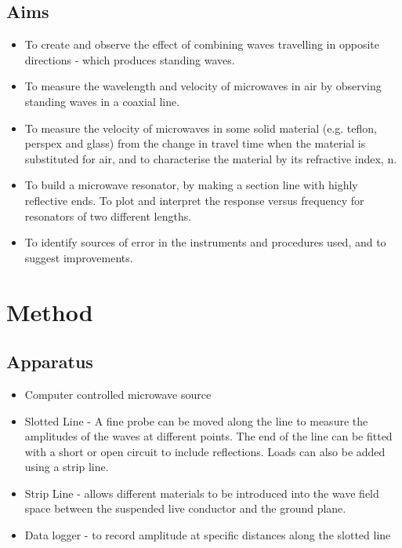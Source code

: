 \documentclass[12pt]{article}
\begin{document}
\subsection{Aims}
\begin{itemize}
    \item To create and observe the effect of combining waves travelling in opposite directions - 
    which produces standing waves.
    \item To measure the wavelength and velocity of microwaves in air by observing standing waves
    in a coaxial line.
    \item To measure the velocity of microwaves in some solid material (e.g. teflon, perspex and
    glass) from the change in travel time when the material is substituted for air, and to
    characterise the material by its refractive index, n.
    \item To build a microwave resonator, by making a section line with highly reflective ends. To
    plot and interpret the response versus frequency for resonators of two different lengths.
    \item To identify sources of error in the instruments and procedures used, and to suggest
    improvements.
\end{itemize}

\section{Method}

\subsection{Apparatus}

\begin{itemize}
    \item Computer controlled microwave source
    \item Slotted Line - A fine probe can be moved along the line to measure the amplitudes of the waves at different points. The end of the line can be fitted with a short or open circuit to include reflections. Loads can also be added using a strip line.
    \item Strip Line - allows different materials to be introduced into the wave field space between the suspended live conductor and the ground plane.
    \item Data logger - to record amplitude at specific distances along the slotted line
\end{itemize}
\end{document}
